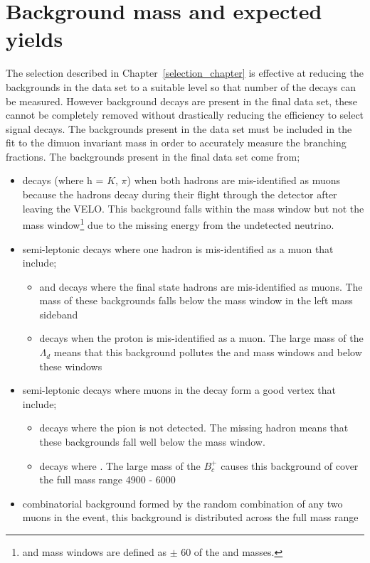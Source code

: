 \section{Background mass \pdfs and expected yields}
\label{sec:backgrounds}
The selection described in Chapter~\ref{selection_chapter} is effective at reducing the backgrounds in the data set to a suitable level so that number of the \bmumu decays can be measured. However background decays are present in the final data set, these cannot be completely removed without drastically reducing the efficiency to select signal decays. The backgrounds present in the data set must be included in the fit to the dimuon invariant mass in order to accurately measure the \bmumu branching fractions. The backgrounds present in the final data set come from;
\begin{itemize}
\item \bhh decays (where h = $K$, $\pi$) when both hadrons are mis-identified as muons because the hadrons decay during their flight through the detector after leaving the VELO. This background falls within the \bd mass window but not the \bs mass window\footnote{\bd and \bs mass windows are defined as $\pm$ 60 \mevcc of the \bd and \bs masses.} due to the missing energy from the undetected neutrino. 
\item semi-leptonic decays where one hadron is mis-identified as a muon that include;
\begin{itemize}
\item \bdpimunu and \bsKmunu decays where the final state hadrons are mis-identified as muons. The mass of these backgrounds falls below the \bd mass window in the left mass sideband
\item \lambdab decays when the proton is mis-identified as a muon. The large mass of the $\Lambda_{d}$ means that this background pollutes the \bs and \bd mass windows and below these windows
\end{itemize}
\item semi-leptonic decays where muons in the decay form a good vertex that include;
\begin{itemize}
\item \bpimumu decays where the pion is not detected. The missing hadron means that these backgrounds fall well below the \bd mass window.
\item \bcjpsimunu decays where \jpsimumu. The large mass of the $B^{+}_{c}$ causes this background of cover the full mass range 4900 - 6000 \mevcc
\end{itemize}
\item combinatorial background formed by the random combination of any two muons in the event, this background is distributed across the full mass range
\end{itemize}

